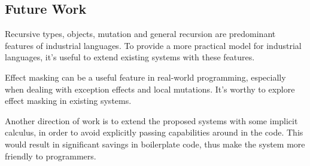 \subsection{Future Work}

Recursive types, objects, mutation and general recursion are
predominant features of industrial languages. To provide a more
practical model for industrial languages, it's useful to extend
existing systems with these features.

Effect masking can be a useful feature in real-world programming,
especially when dealing with exception effects and local mutations.
It's worthy to explore effect masking in existing systems.

Another direction of work is to extend the proposed systems with some
implicit calculus, in order to avoid explicitly passing capabilities
around in the code. This would result in significant savings in
boilerplate code, thus make the system more friendly to programmers.


